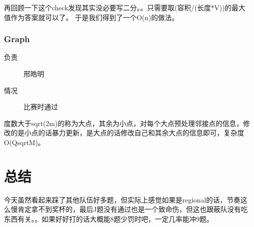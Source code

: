 \documentclass[a4paper, 11pt, nofonts, nocap, fancyhdr]{ctexart}
\newcommand{\problem}[1]{\subsubsection{#1}}
\begin{document}
再回顾一下这个check发现其实没必要写二分。。只需要取(容积/(长度*V))的最大值作为答案就可以了。
于是我们得到了一个O(n)的做法。

\problem{Graph}

\begin{description}
\item[负责] 邢皓明
\item[情况] 比赛时通过
\end{description}

度数大于sqrt(2m)的称为大点，其余为小点，对每个大点预处理邻接点的信息，修改的是小点的话暴力更新，是大点的话修改自己和其余大点的信息即可，复杂度O(QsqrtM)。

\section{总结}

今天虽然看起来踩了其他队伍好多题，但实际上感觉如果是regional的话，节奏这么慢肯定拿不到奖杯的，最后J题没有通过也是一个致命伤，但这也跟蔽队没有吃东西有关。。如果好好打的话大概能8题少罚时吧，一定几率能冲9题。
\end{document}
